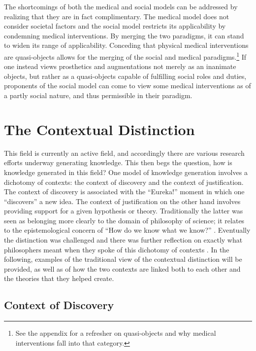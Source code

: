 \documentclass[a4paper]{article}
\begin{document}
The shortcomings of both the medical and social models can be addressed by
realizing that they are in fact complimentary. The medical model does not
consider societal factors and the social model restricts its applicability by
condemning medical interventions. By merging the two paradigms, it can stand
to widen its range of applicability. Conceding that physical medical
interventions are  quasi-objects allows for the merging of the social and
medical paradigms.\footnote{See the appendix for a refresher on quasi-objects
and why medical interventions fall into that category.} If one instead views
prosthetics and augmentations not merely as an inanimate objects, but rather
as a quasi-objects capable of fulfilling social roles and duties, proponents
of the social model can come to view some medical interventions as of a partly
social nature, and thus permissible in their paradigm.

\newpage
\section{The Contextual Distinction}

This field is currently an active field, and accordingly there are various
research efforts underway generating knowledge. This then begs the question,
how is knowledge generated in this field? One model of knowledge generation
involves a dichotomy of contexts: the context of discovery and the context of
justification. The context of discovery is associated with the ``Eureka!''
moment in which one ``discovers'' a new idea. The context of justification on
the other hand involves providing support for a given hypothesis or theory.
Traditionally the latter was seen as belonging more clearly to the domain of
philosophy of science; it relates to the epistemological concern of ``How do
we know what we know?'' \citep{schickore2014scientific}. Eventually the
distinction was challenged and there was further reflection on exactly what
philosophers meant when they spoke of this dichotomy of contexts
\citep{hoyningen2006context}. In the following, examples of the traditional
view of the contextual distinction will be provided, as well as of how the two
contexts are linked both to each other and the theories that they helped
create.

\subsection{Context of Discovery}
\end{document}
